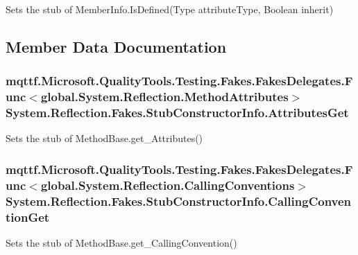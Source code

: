 Sets the stub of Member\-Info.\-Is\-Defined(\-Type attribute\-Type, Boolean inherit)



\subsection{Member Data Documentation}
\hypertarget{class_system_1_1_reflection_1_1_fakes_1_1_stub_constructor_info_a7d2c9bedd2ac28bf9e29870e5d72a78e}{
\subsubsection[{Attributes\-Get}]{\setlength{\rightskip}{0pt plus 5cm}mqttf.\-Microsoft.\-Quality\-Tools.\-Testing.\-Fakes.\-Fakes\-Delegates.\-Func$<$global.\-System.\-Reflection.\-Method\-Attributes$>$ System.\-Reflection.\-Fakes.\-Stub\-Constructor\-Info.\-Attributes\-Get}}\label{class_system_1_1_reflection_1_1_fakes_1_1_stub_constructor_info_a7d2c9bedd2ac28bf9e29870e5d72a78e}


Sets the stub of Method\-Base.\-get\-\_\-\-Attributes()

\hypertarget{class_system_1_1_reflection_1_1_fakes_1_1_stub_constructor_info_a48d575add7a603461fdbd10a599e68f3}{
\subsubsection[{Calling\-Convention\-Get}]{\setlength{\rightskip}{0pt plus 5cm}mqttf.\-Microsoft.\-Quality\-Tools.\-Testing.\-Fakes.\-Fakes\-Delegates.\-Func$<$global.\-System.\-Reflection.\-Calling\-Conventions$>$ System.\-Reflection.\-Fakes.\-Stub\-Constructor\-Info.\-Calling\-Convention\-Get}}\label{class_system_1_1_reflection_1_1_fakes_1_1_stub_constructor_info_a48d575add7a603461fdbd10a599e68f3}


Sets the stub of Method\-Base.\-get\-\_\-\-Calling\-Convention()

